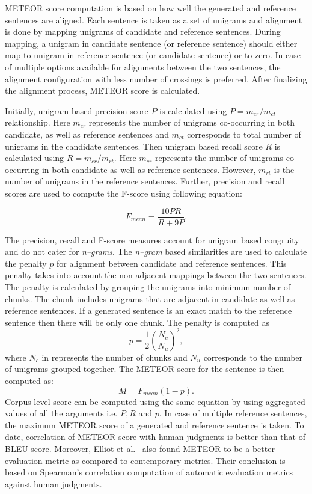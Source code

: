 \documentclass[10pt,journal,compsoc]{IEEEtran}
\begin{document}
METEOR score computation is based on how well the generated and reference sentences are aligned. Each sentence is taken as a set of unigrams and alignment is done by mapping unigrams of candidate and reference sentences. During mapping, a unigram in candidate sentence (or reference sentence) should either map to unigram in reference sentence (or candidate sentence) or to zero. In case of multiple options available for alignments between the two sentences, the alignment configuration with less number of crossings is preferred. After finalizing the alignment process, METEOR score is calculated.

Initially, unigram based precision score $P$ is calculated using $P=m_{cr}/m_{ct}$ relationship. 
Here $m_{cr}$ represents the number of unigrams co-occurring in both candidate, as well as reference sentences and $m_{ct}$ corresponds to total number of unigrams in the candidate sentences. Then unigram based recall score $R$ is calculated using $R=m_{cr}/m_{rt}$. Here $m_{cr}$ represents the number of unigrams co-occurring in both candidate as well as reference sentences. However, $m_{rt}$ is the number of unigrams in the reference sentences. Further, precision and recall scores are used to compute the F-score using following equation: 

\vspace{-2mm}
$$F_{mean}=\frac{10PR}{R+9P}.$$

The precision, recall and F-score measures account for unigram based congruity and do not cater for \textit{n--grams}. The \textit{n--gram} based similarities are used to calculate the penalty $p$ for alignment between candidate and reference sentences. This penalty takes into account the non-adjacent mappings between the two sentences. The penalty is calculated by grouping the unigrams into minimum number of chunks. The chunk includes unigrams that are adjacent in candidate as well as reference sentences. If a generated sentence is an exact match to the reference sentence then there will be only one chunk. The penalty is computed as 
$$p=\frac{1}{2}(\frac{N_c}{N_u})^2,$$ 
where $N_c$ in represents the number of chunks and $N_u$ corresponds to the number of unigrams grouped together. The METEOR score for the sentence is then computed as:
$$M=F_{mean} (1 - p).$$
Corpus level score can be computed using the same equation by using aggregated values of all the arguments i.e. $P, R$ and $p$. 
In case of multiple reference sentences, the maximum METEOR score of a generated and reference sentence is taken. To date, correlation of METEOR score with human judgments is better than that of BLEU score. Moreover, Elliot et al.~\cite{elliott2014comparing} also found METEOR to be a better evaluation metric as compared to contemporary metrics. Their conclusion is based on Spearman's correlation computation of automatic evaluation metrics against human judgments.
\end{document}
